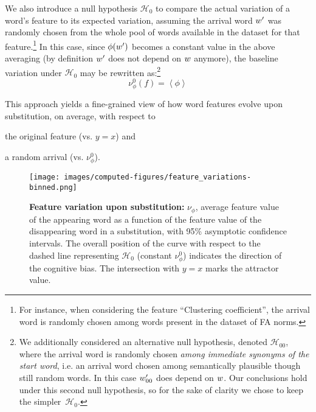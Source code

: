 We also introduce a null hypothesis $\mathcal{H}_0$ to compare the actual variation of a word's feature to its expected variation, assuming the arrival word $w'$ was randomly chosen from the whole pool of words available in the dataset for that feature.\footnote{For instance, when considering the feature ``Clustering coefficient'', the arrival word is randomly chosen among words present in the dataset of FA norms.}
In this case, since $\phi(w')$ becomes a constant value in the above averaging (by definition $w'$ does not depend on $w$ anymore),  the baseline variation under $\mathcal{H}_0$ may be rewritten as:\footnote{We additionally considered an alternative null hypothesis, denoted $\mathcal{H}_{00}$, where the arrival word is randomly chosen \emph{among immediate synonyms of the start word}, \hbox{i.e.} an arrival word chosen among semantically plausible though still random words. In this case $w'_{00}$ does depend on $w$. Our conclusions hold under this second null hypothesis, so for the sake of clarity we chose to keep the simpler~$\mathcal{H}_0$.}
$$\nu_{\phi}^0 (f) = \left<\phi\right>$$

This approach yields a fine-grained view of how word features evolve upon substitution, on average, with respect to 
\begin{seriate}
\item the original feature (\hbox{vs.} $y=x$) and 
\item a random arrival (\hbox{vs.} $\nu_{\phi}^0$).
\end{seriate}
\begin{figure*}[!th]
    \centering
    \texttt{[image: images/computed-figures/feature\_variations-binned.png]}
    \caption{\textbf{Feature variation upon substitution:} $\nu_\phi$, average feature value of the appearing word as a function of the feature value of the disappearing word in a substitution, with 95\% asymptotic confidence intervals.
    The overall position of the curve with respect to the dashed line representing $\mathcal{H}_0$ (constant $\nu_{\phi}^0$) indicates the direction of the cognitive bias.
    The intersection with $y = x$ marks the attractor value.
    }
    \label{fig:feature-variations}
\end{figure*}

